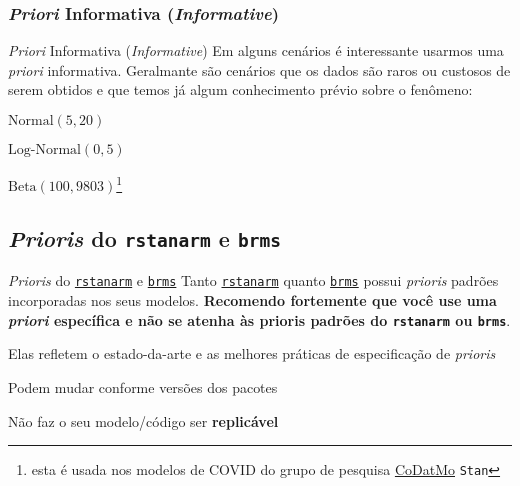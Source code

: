 \subsubsection{\textit{Priori} Informativa (\textit{Informative})}
\begin{frame}{\textit{Priori} Informativa (\textit{Informative})}
	Em alguns cenários é interessante usarmos uma \textit{priori} informativa.
	Geralmante são cenários que os dados são raros ou custosos de serem obtidos
	e que temos já algum conhecimento prévio sobre o fenômeno:
	\begin{vfilleditems}
		\item $\text{Normal}(5, 20)$
		\item $\text{Log-Normal}(0, 5)$
		\item $\text{Beta}(100, 9803)$\footnote{esta é usada nos modelos de COVID do grupo de pesquisa \href{https://codatmo.github.io}{CoDatMo} \texttt{Stan}}
	\end{vfilleditems}
\end{frame}

\subsection{\textit{Prioris} do \texttt{rstanarm} e \texttt{brms}}
\begin{frame}{\textit{Prioris} do \href{http://mc-stan.org/rstanarm/}{\texttt{rstanarm}} e \href{https://paul-buerkner.github.io/brms/}{\texttt{brms}}}
	Tanto \href{http://mc-stan.org/rstanarm/}{\texttt{rstanarm}}
	quanto \href{https://paul-buerkner.github.io/brms/}{\texttt{brms}} possui \textit{prioris}
	padrões incorporadas nos seus modelos.
	\vfill
	\textbf{Recomendo fortemente que você use uma \textit{priori} específica e não se atenha
		às prioris padrões do \texttt{rstanarm} ou \texttt{brms}}.
	\vfill
	\begin{vfilleditems}
		\item Elas refletem o estado-da-arte e as melhores práticas
		de especificação de \textit{prioris}
		\item Podem mudar conforme versões dos pacotes
		\item Não faz o seu modelo/código ser \textbf{replicável}
	\end{vfilleditems}
\end{frame}

